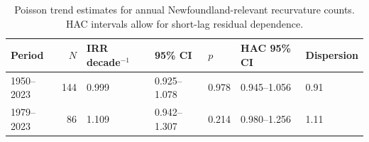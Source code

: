 \begin{table}[htbp]
\caption{Poisson trend estimates for annual Newfoundland-relevant recurvature counts. HAC intervals allow for short-lag residual dependence.}
\label{tab:frequency_trends}
\begin{tabular}{lrlllll}
\toprule
Period & $N$ & IRR decade$^{-1}$ & 95\% CI & $p$ & HAC 95\% CI & Dispersion \\
\midrule
1950--2023 & 144 & 0.999 & 0.925--1.078 & 0.978 & 0.945--1.056 & 0.91 \\
1979--2023 & 86 & 1.109 & 0.942--1.307 & 0.214 & 0.980--1.256 & 1.11 \\
\bottomrule
\end{tabular}
\end{table}
